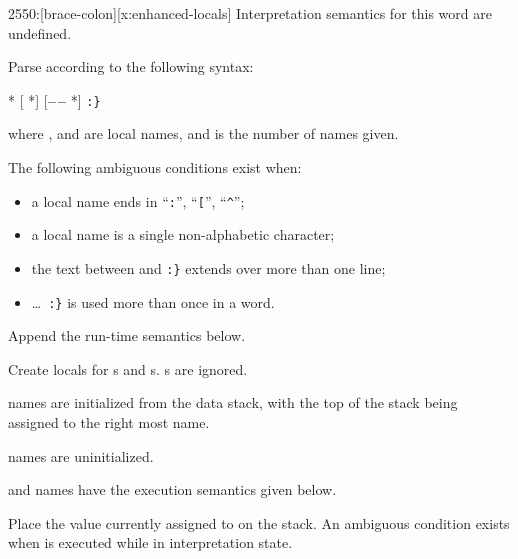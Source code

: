 
\begin{worddef}[b:]{2550}{\brace:}[brace-colon][x:enhanced-locals]
\interpret
	Interpretation semantics for this word are undefined.

\compile

	Parse  according to the following syntax:
	\begin{center}
		 * [\textbf{\textbar} *] [\textbf{--\,--} *] \verb":}"
	\end{center}
	where ,  and  are local names, and
	 is the number of  names given.

	The following ambiguous conditions exist when:
	\begin{itemize}
	\item a local name ends in ``\texttt{:}'', ``\texttt{[}'', ``\texttt{\textasciicircum}'';
	\item a local name is a single non-alphabetic character;
	\item the text between  and \texttt{:\}} extends
			over more than one line;
	\item {} \ldots\ \texttt{:\}} is used more than once in a word.
	\end{itemize}

	Append the run-time semantics below. 

\runtime

	Create locals for s and s. s are ignored.

	\begin{list}{}{
		\setlength{\leftmargin}{2.6em}
		\setlength{\labelwidth}{2.4em}
	}
	\item[\arg{arg}] names are initialized from the data stack, with the
		top of the stack being assigned to the right most  name.

	\item[\arg{val}] names are uninitialized.
	\end{list}

	  and  names have the execution semantics
		given below.

\execute[name]

	Place the value currently assigned to  on the stack.
	An ambiguous condition exists when  is executed while
	in interpretation state.


\end{worddef}
